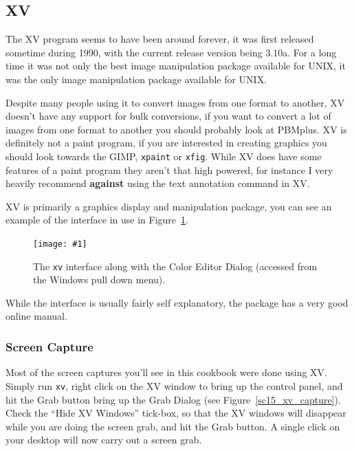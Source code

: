 \documentclass[twoside,11pt]{article}
\newcommand{\htmladdnormallink}[2]{#1}
\newcommand{\htmladdimg}[1]{}
\newcommand{\htmlref}[2]{#1}
\newcommand{\xlabel}[1]{}
\newcommand{\myfig} [5] {
  \begin{figure}
    \centering\texttt{[image: \#1]}
    \typeout{#1 inserted on page \arabic{page}}
    \caption{\label{#4}#5}
  \end{figure}
  }
\newcommand{\myfig}[5]{
    \label{#4} \htmladdimg{#3}\\
    Figure: #5\\
    }
\begin{document}

\subsection{\xlabel{sc15_xv}XV\label{sc15_xv}}

The \htmladdnormallink{XV}{http://www.trilon.com/xv/} program seems to have been around forever, it was first released sometime during 1990, with the current release version being 3.10a. For a long time it was not only the best image manipulation package available for UNIX, it was the only image manipulation package available for UNIX. 

Despite many people using it to convert images from one format to another, XV doesn't have any support for bulk conversions, if you want to convert a lot of images from one format to another you should probably look at \htmlref{PBMplus}{sc15_pbmplus}. XV is definitely not a paint program, if you are interested in creating graphics you should look towards the \htmlref{GIMP}{sc15_gimp}, \htmlref{{\tt xpaint}}{sc15_xpaint} or \htmlref{{\tt xfig}}{sc15_xfig}. While XV does have some features of a paint program they aren't that high powered, for instance I very heavily recommend {\bf against} using the text annotation command in XV.

XV is primarily a graphics display and manipulation package, you can see an example of the interface in use in Figure~\ref{sc15_xv_interface}.

\myfig{sc15_xv.eps}{height=0.8\textheight}{sc15_xv.gif}{sc15_xv_interface}{The {\tt xv} interface along with the Color Editor Dialog (accessed from the Windows pull down menu).} 

While the interface is usually fairly self explanatory, the package has a very good online \htmladdnormallink{manual}{http://www.trilon.com/xv/manual/xv-3.10a/cover.html}.

\subsubsection{Screen Capture}

Most of the screen captures you'll see in this cookbook were done using XV. Simply run {\tt xv}, right click on the XV window to bring up the control panel, and hit the {\sc Grab} button bring up the Grab Dialog (see Figure~\ref{sc15_xv_capture}). Check the ``Hide XV Windows'' tick-box, so that the XV windows will disappear while you are doing the screen grab, and hit the {\sc Grab} button. A single click on your desktop will now carry out a screen grab.
\end{document}
